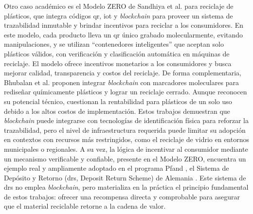 Otro caso académico es el Modelo ZERO de Sandhiya et al. \cite{sandhiya2020investigating} para reciclaje de plásticos, que integra códigos \gls{qr}, \gls{iot} y \textit{blockchain} para proveer un sistema de trazabilidad inmutable y brindar incentivos para reciclar a los consumidores. En este modelo, cada producto lleva un \gls{qr} único grabado molecularmente, evitando manipulaciones, y se utilizan ``contenedores inteligentes'' que aceptan solo plásticos válidos, con verificación y clasificación automática en máquinas de reciclaje. El modelo ofrece incentivos monetarios a los consumidores y busca mejorar calidad, transparencia y costos del reciclaje. De forma complementaria, Bhubalan et al. \cite{bhubalan2022blockchain} proponen integrar \textit{blockchain} con marcadores moleculares para rediseñar químicamente plásticos y lograr un reciclaje cerrado. Aunque reconocen su potencial técnico, cuestionan la rentabilidad para plásticos de un solo uso debido a los altos costos de implementación. Estos trabajos demuestran que \textit{blockchain} puede integrarse con tecnologías de identificación física para reforzar la trazabilidad, pero el nivel de infraestructura requerida puede limitar su adopción en contextos con recursos más restringidos, como el reciclaje de vidrio en entornos municipales o regionales. A su vez, la lógica de incentivar al consumidor mediante un mecanismo verificable y confiable, presente en el Modelo ZERO, encuentra un ejemplo real y ampliamente adoptado en el programa Pfand \cite{de2020sustainability}, el Sistema de Depósito y Retorno (\gls{drs}, Deposit Return Scheme) de Alemania \cite{picuno2025potential}. Este sistema de \gls{drs} no emplea \textit{blockchain}, pero materializa en la práctica el principio fundamental de estos trabajos: ofrecer una recompensa directa y comprobable para asegurar que el material reciclable retorne a la cadena de valor.

